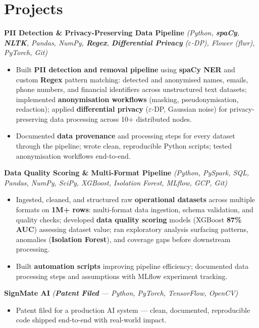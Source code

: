 \documentclass[10pt, letterpaper]{article}
\newcommand{\proj}[2]{\noindent\textbf{#1} \textit{\small #2}}
\begin{document}
\section{Projects}
\proj{\textbf{PII Detection} \& Privacy-Preserving Data Pipeline}{(Python, \textbf{spaCy}, \textbf{NLTK}, Pandas, NumPy, \textbf{Regex}, \textbf{Differential Privacy} ($\varepsilon$-DP), Flower (flwr), PyTorch, Git)}
\begin{itemize}
\item Built \textbf{PII detection and removal pipeline} using \textbf{spaCy NER} and custom \textbf{Regex} pattern matching: detected and anonymised names, emails, phone numbers, and financial identifiers across unstructured text datasets; implemented \textbf{anonymisation workflows} (masking, pseudonymisation, redaction); applied \textbf{differential privacy} ($\varepsilon$-DP, Gaussian noise) for privacy-preserving data processing across 10+ distributed nodes.
\item Documented \textbf{data provenance} and processing steps for every dataset through the pipeline; wrote clean, reproducible Python scripts; tested anonymisation workflows end-to-end.
\end{itemize}
\vspace{0.6pt}
\proj{\textbf{Data Quality Scoring} \& Multi-Format Pipeline}{(Python, PySpark, SQL, Pandas, NumPy, SciPy, XGBoost, Isolation Forest, MLflow, GCP, Git)}
\begin{itemize}
\item Ingested, cleaned, and structured raw \textbf{operational datasets} across multiple formats on \textbf{1M+ rows}: multi-format data ingestion, schema validation, and quality checks; developed \textbf{data quality scoring} models (XGBoost \textbf{87\% AUC}) assessing dataset value; ran exploratory analysis surfacing patterns, anomalies (\textbf{Isolation Forest}), and coverage gaps before downstream processing.
\item Built \textbf{automation scripts} improving pipeline efficiency; documented data processing steps and assumptions with MLflow experiment tracking.
\end{itemize}
\vspace{0.6pt}
\proj{SignMate AI}{(\textbf{Patent Filed} --- Python, PyTorch, TensorFlow, OpenCV)}
\begin{itemize}
\item Patent filed for a production AI system --- clean, documented, reproducible code shipped end-to-end with real-world impact.
\end{itemize}
\end{document}
